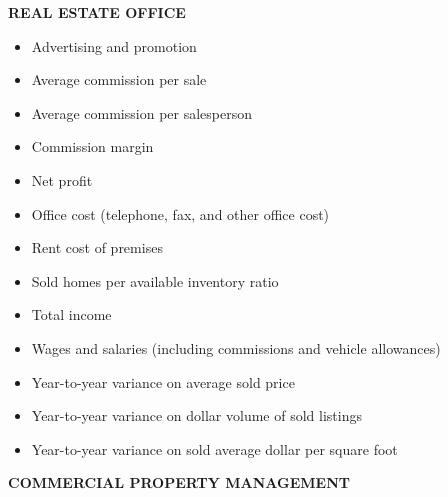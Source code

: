\documentclass[]{book}
\providecommand{\tightlist}{%
  \setlength{\itemsep}{0pt}\setlength{\parskip}{0pt}}
\begin{document}
\textbf{REAL ESTATE OFFICE }

\begin{itemize}
\tightlist
\item
  Advertising and promotion
\item
  Average commission per sale
\item
  Average commission per salesperson
\item
  Commission margin
\item
  Net profit
\item
  Office cost (telephone, fax, and other office cost)
\item
  Rent cost of premises
\item
  Sold homes per available inventory ratio
\item
  Total income
\item
  Wages and salaries (including commissions and vehicle allowances)
\item
  Year-to-year variance on average sold price
\item
  Year-to-year variance on dollar volume of sold listings
\item
  Year-to-year variance on sold average dollar per square foot
\end{itemize}

\textbf{COMMERCIAL PROPERTY MANAGEMENT }
\end{document}
